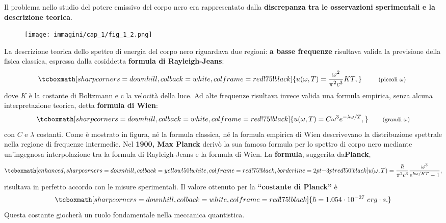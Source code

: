 \documentclass[a4paper,12pt,oneside]{book}
\begin{document}
Il problema nello studio del potere emissivo del corpo nero era rappresentato dalla \textbf{discrepanza tra le osservazioni sperimentali e la descrizione teorica}.
	\begin{figure}[!htbp]
		\begin{center}
			\texttt{[image: immagini/cap\_1/fig\_1\_2.png]}
		\end{center}
	\end{figure}
	
La descrizione teorica dello spettro di energia del corpo nero riguardava due regioni: \textbf{a basse frequenze} risultava valida la previsione della fisica classica, espressa dalla cosiddetta \textbf{formula di Rayleigh-Jeans}:
	\begin{equation}
		\tcboxmath[sharp corners=downhill ,colback=white,colframe=red!75!black]{
			u(\omega , T)= \frac{\omega ^2}{\pi ^2 c^3}KT,
		}
			\qquad \textrm{ \footnotesize{(piccoli $\omega$)} }
	\end{equation}
dove $K$ è la costante di Boltzmann e c la velocità della luce. Ad alte frequenze risultava invece valida una formula empirica, senza alcuna interpretazione teorica, detta \textbf{formula di Wien}:
	\begin{equation}
		\tcboxmath[sharp corners=downhill ,colback=white,colframe=red!75!black]{
			u(\omega ,T)= C \omega ^3 e^{-\lambda \omega /T},
		}
			\qquad \textrm{\footnotesize{(grandi $\omega$)}}
	\end{equation}
con $C$ e $\lambda$ costanti. Come è mostrato in figura, né la formula classica, né  la formula empirica di Wien descrivevano la distribuzione spettrale nella regione di frequenze intermedie.
Nel \textbf{1900, Max Planck} derivò la sua famosa formula per lo spettro di corpo nero mediante un'ingegnosa interpolazione tra la formula di Rayleigh-Jeans e la formula di Wien. La \textbf{formula}, suggerita da\textbf{Planck},
	\begin{equation}
	\tcboxmath[enhanced,sharp corners=downhill ,colback=yellow!50!white,colframe=red!75!black, borderline={2pt}{-3pt}{red!50!black}]{
		u(\omega, T) = \frac{\hbar}{\pi ^2 c^3}\frac{\omega ^3}{e^{\hbar \omega / KT}-1},
	}
\end{equation}
risultava in perfetto accordo con le misure sperimentali. Il valore ottenuto per la \textbf{``costante di Planck''} è
\[ \tcboxmath[sharp corners=downhill ,colback=white,colframe=red!75!black]{\hbar = 1.054 \cdot 10^{-27} \ erg\cdot s.}\]
Questa costante giocherà un ruolo fondamentale nella meccanica quantistica.\\
\end{document}
